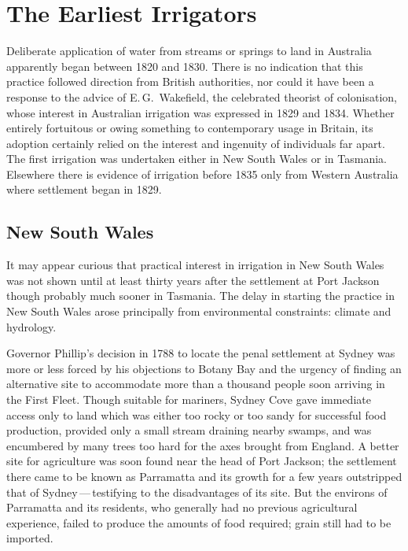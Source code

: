 
\setcounter{endnote}{0}

\chapter{The Earliest Irrigators}
\label{ch:early}



Deliberate application of water from streams or springs to land in
Australia apparently began between 1820 and 1830.  There is no
indication that this practice followed direction from British
authorities, nor could it have been a response to the advice of
E.\,G.~Wakefield, the celebrated theorist of
colonisation, whose interest in Australian irrigation was expressed in
1829 and 1834.  Whether entirely fortuitous or owing something to
contemporary usage in Britain, its adoption certainly relied on the
interest and ingenuity of individuals far apart.  The first irrigation
was undertaken either in New South Wales or in Tasmania.  Elsewhere
there is evidence of irrigation before 1835 only from Western
Australia where settlement began in 1829.

\section*{\textsf{New South Wales}}
\label{sec:nsw}

It may appear curious that practical interest in irrigation in New
South Wales was not shown until at least thirty years after the
settlement at Port Jackson though probably much sooner in Tasmania.
The delay in starting the practice in New South Wales arose
principally from environmental constraints: climate and hydrology.

Governor Phillip's decision in 1788 to locate
the penal settlement at Sydney was more or less
forced by his objections to Botany Bay and the
urgency of finding an alternative site to accommodate more than a
thousand people soon arriving in the First Fleet.  Though suitable for
mariners, Sydney Cove gave immediate access only to land which was
either too rocky or too sandy for successful food production, provided
only a small stream draining nearby swamps, and was encumbered by many
trees too hard for the axes brought from England.  A better site for
agriculture was soon found near the head of Port Jackson; the settlement there came to be known as Parramatta
 and its growth for a few years outstripped that
of Sydney\,---\,testifying to the disadvantages of its site.  But the
environs of Parramatta and its residents, who generally had no
previous agricultural experience, failed to produce the amounts of
food required; grain still had to be imported.

